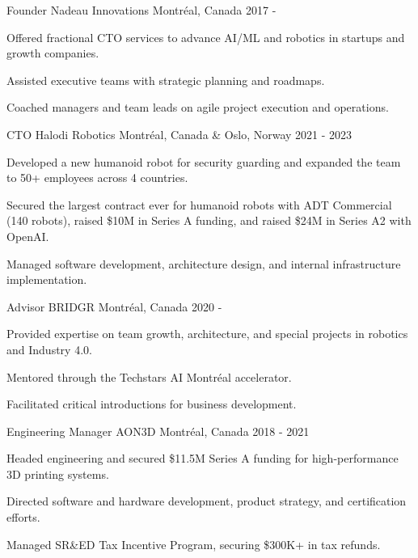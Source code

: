 \documentclass[11pt, letterpaper]{awesome-cv}
\begin{document}
\makecvheader

\begin{cventries}
    \cventry
    {Founder}
    {Nadeau Innovations}
    {Montréal, Canada}
    {2017 - }
    {
        \begin{cvitems}
            \item{Offered fractional CTO services to advance AI/ML and robotics in startups and growth companies.}
            \item{Assisted executive teams with strategic planning and roadmaps.}
            \item{Coached managers and team leads on agile project execution and operations.}
        \end{cvitems}
    }

    \cventry
    {CTO}
    {Halodi Robotics}
    {Montréal, Canada \& Oslo, Norway}
    {2021 - 2023}
    {
        \begin{cvitems}
            \item{Developed a new humanoid robot for security guarding and expanded the team to 50+ employees across 4 countries.}
            \item{Secured the largest contract ever for humanoid robots with ADT Commercial (140 robots), raised \$10M in Series A funding, and raised \$24M in Series A2 with OpenAI.}
            \item{Managed software development, architecture design, and internal infrastructure implementation.}
        \end{cvitems}
    }

    \cventry
    {Advisor}
    {BRIDGR}
    {Montréal, Canada}
    {2020 - }
    {
        \begin{cvitems}
            \item{Provided expertise on team growth, architecture, and special projects in robotics and Industry 4.0.}
            \item{Mentored through the Techstars AI Montréal accelerator.}
            \item{Facilitated critical introductions for business development.}
        \end{cvitems}
    }

    \cventry
    {Engineering Manager}
    {AON3D}
    {Montréal, Canada}
    {2018 - 2021}
    {
        \begin{cvitems}
            \item{Headed engineering and secured \$11.5M Series A funding for high-performance 3D printing systems.}
            \item{Directed software and hardware development, product strategy, and certification efforts.}
            \item{Managed SR\&ED Tax Incentive Program, securing \$300K+ in tax refunds.}
        \end{cvitems}
    }



\end{cventries}
\end{document}
